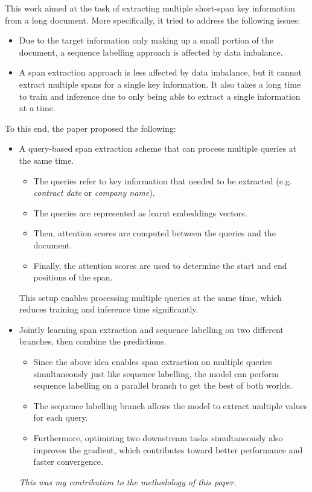 \documentclass[english,report,10pt]{extarticle}
\begin{document}
This work aimed at the task of extracting multiple short-span key information from a long document. More specifically, it tried to address the following issues:

\begin{itemize}
    \item Due to the target information only making up a small portion of the document, a sequence labelling approach is affected by data imbalance.
    \item A span extraction approach is less affected by data imbalance, but it cannot extract multiple spans for a single key information. It also takes a long time to train and inference due to only being able to extract a single information at a time.
\end{itemize}

To this end, the paper proposed the following:

\begin{itemize}
    \item A query-based span extraction scheme that can process multiple queries at the same time.
          \begin{itemize}
              \item The queries refer to key information that needed to be extracted (e.g. \textit{contract date} or \textit{company name}).
              \item The queries are represented as learnt embeddings vectors.
              \item Then, attention scores are computed between the queries and the document.
              \item Finally, the attention scores are used to determine the start and end positions of the span.
          \end{itemize}

          This setup enables processing multiple queries at the same time, which reduces training and inference time significantly.

    \item Jointly learning span extraction and sequence labelling on two different branches, then combine the predictions.
          \begin{itemize}
              \item Since the above idea enables span extraction on multiple queries simultaneously just like sequence labelling, the model can perform sequence labelling on a parallel branch to get the best of both worlds.
              \item The sequence labelling branch allows the model to extract multiple values for each query.
              \item Furthermore, optimizing two downstream tasks simultaneously also improves the gradient, which contributes toward better performance and faster convergence.
          \end{itemize}

          \textit{This was my contribution to the methodology of this paper.}

\end{itemize}
\end{document}
